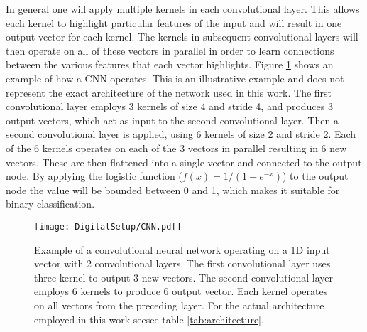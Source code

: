 \documentclass[main.tex]{subfiles}
\begin{document}
\begin{appendices}
In general one will apply multiple kernels in each convolutional layer. This allows each kernel to highlight particular features of the input and will result in one output vector for each kernel. The kernels in subsequent convolutional layers will then operate on all of these vectors in parallel in order to learn connections between the various features that each vector highlights.
Figure \ref{fig:CNN} shows an example of how a CNN operates. This is an illustrative example and does not represent the exact architecture of the network used in this work. The first convolutional layer employs 3 kernels of size 4 and stride 4, and produces 3 output vectors, which act as input to the second convolutional layer. Then a second convolutional layer is applied, using 6 kernels of size 2 and stride 2. Each of the 6 kernels operates on each of the 3 vectors in parallel resulting in 6 new vectors. These are then flattened into a single vector and connected to the output node. By applying the logistic function ($f(x)=1/(1-e^{-x})$) to the output node the value will be bounded between 0 and 1, which makes it suitable for binary classification.

\begin{figure}[ht!]
    \centering
        \texttt{[image: DigitalSetup/CNN.pdf]}
        \caption[Example of a convolutional neural network]{Example of a convolutional neural network operating on a 1D input vector with 2 convolutional layers. The first convolutional layer uses three kernel to output 3 new vectors. The second convolutional layer employs 6 kernels to produce 6 output vector. Each kernel operates on all vectors from the preceding layer. For the actual architecture employed in this work seesee table \ref{tab:architecture}.}
    \label{fig:CNN} 
\end{figure}




\end{appendices}
\end{document}
